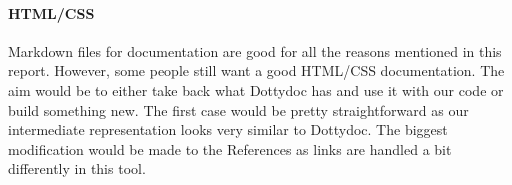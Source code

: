 \documentclass{report}
\begin{document}
\paragraph{HTML/CSS}
Markdown files for documentation are good for all the reasons mentioned in this report. However, some people still want a good HTML/CSS documentation. The aim would be to either take back what Dottydoc has and use it with our code or build something new. The first case would be pretty straightforward as our intermediate representation looks very similar to Dottydoc. The biggest modification would be made to the References as links are handled a bit differently in this tool.
\end{document}
